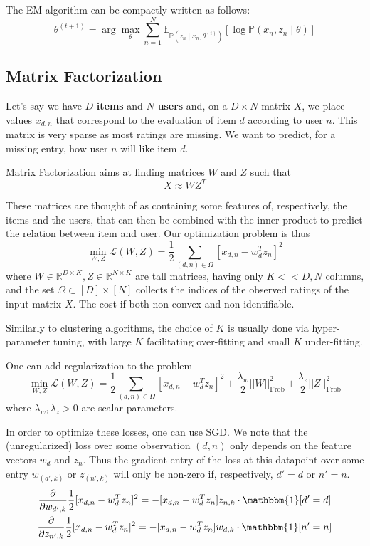 \documentclass{article}
\newcommand{\R}{\mathbb{R}}
\newcommand{\prob}{\mathbb{P}}
\newcommand{\E}{\mathbb{E}}
\newcommand{\ind}{\mathbbm{1}}
\newcommand{\loss}{\mathcal{L}}
\begin{document}
The EM algorithm can be compactly written as follows:
$$
\theta^{(t+1)} = \arg \max_\theta \sum_{n=1}^N \E_{\prob(z_n \mid x_n, \theta^{(t)})} \left[ \log \prob(x_n, z_n \mid \theta) \right]
$$

\subsection{Matrix Factorization}

Let's say we have $D$ \textbf{items} and $N$ \textbf{users} and, on a $D \times N$ matrix $X$, we place values $x_{d,n}$ that correspond to the evaluation of item $d$ according to user $n$.
This matrix is very sparse as most ratings are missing.
We want to predict, for a missing entry, how user $n$ will like item $d$.

Matrix Factorization aims at finding matrices $W$ and $Z$ such that
$$
X \approx WZ^T
$$

These matrices are thought of as containing some features of, respectively, the items and the users, that can then be combined with the inner product to predict the relation between item and user.
Our optimization problem is thus
$$
\min_{W, Z} \loss(W, Z) = \frac{1}{2} \sum_{(d,n) \in \Omega} [ x_{d,n} - w_d^T z_n]^2
$$
where $W \in \R^{D \times K}, Z \in \R^{N \times K}$ are tall matrices, having only $K << D, N$ columns, and the set $\Omega \subset [D] \times [N]$ collects the indices of the observed ratings of the input matrix $X$.
The cost if both non-convex and non-identifiable.

Similarly to clustering algorithms, the choice of $K$ is usually done via hyper-parameter tuning, with large $K$ facilitating over-fitting and small $K$ under-fitting.

One can add regularization to the problem
$$
\min_{W, Z} \loss(W, Z) = 
\frac{1}{2} \sum_{(d,n) \in \Omega} [ x_{d,n} - w_d^T z_n]^2 +
    \frac{\lambda_w}{2} ||W||^2_\text{Frob} +
    \frac{\lambda_z}{2} ||Z||^2_\text{Frob}
$$
where $\lambda_w, \lambda_z > 0$ are scalar parameters.

In order to optimize these losses, one can use SGD.
We note that the (unregularized) loss over some observation $(d,n)$ only depends on the feature vectors $w_d$ and $z_n$.
Thus the gradient entry of the loss at this datapoint over some entry $w_{(d', k)}$ or $z_{(n', k)}$ will only be non-zero if, respectively, $d' = d$ or $n' = n$.
\begin{gather*}
\frac{\partial}{\partial w_{d', k}} \frac{1}{2} [x_{d,n} - w_d^T z_n]^2 =
-[x_{d,n} - w_d^T z_n] z_{n,k} \cdot \ind[d' = d] \\
\frac{\partial}{\partial z_{n', k}} \frac{1}{2} [x_{d,n} - w_d^T z_n]^2 =
-[x_{d,n} - w_d^T z_n] w_{d,k} \cdot \ind[n' = n]
\end{gather*}
\end{document}
